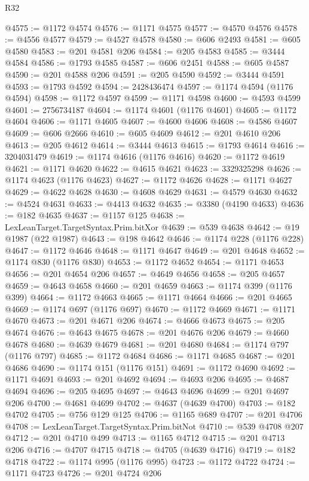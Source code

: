 \begin{lexlean}{R32}
\begin{coremodule}
@4575 := @1172 @4574
@4576 := @1171 @4575
@4577 := @4570 @4576
@4578 := @4556 @4577
@4579 := @4527 @4578
@4580 := @606 @2493
@4581 := @605 @4580
@4583 := @201 @4581 @206
@4584 := @205 @4583
@4585 := @3444 @4584
@4586 := @1793 @4585
@4587 := @606 @2451
@4588 := @605 @4587
@4590 := @201 @4588 @206
@4591 := @205 @4590
@4592 := @3444 @4591
@4593 := @1793 @4592
@4594 := 2428436474
@4597 := @1174 @4594 (@1176 @4594)
@4598 := @1172 @4597
@4599 := @1171 @4598
@4600 := @4593 @4599
@4601 := 2756734187
@4604 := @1174 @4601 (@1176 @4601)
@4605 := @1172 @4604
@4606 := @1171 @4605
@4607 := @4600 @4606
@4608 := @4586 @4607
@4609 := @606 @2666
@4610 := @605 @4609
@4612 := @201 @4610 @206
@4613 := @205 @4612
@4614 := @3444 @4613
@4615 := @1793 @4614
@4616 := 3204031479
@4619 := @1174 @4616 (@1176 @4616)
@4620 := @1172 @4619
@4621 := @1171 @4620
@4622 := @4615 @4621
@4623 := 3329325298
@4626 := @1174 @4623 (@1176 @4623)
@4627 := @1172 @4626
@4628 := @1171 @4627
@4629 := @4622 @4628
@4630 := @4608 @4629
@4631 := @4579 @4630
@4632 := @4524 @4631
@4633 := @4413 @4632
@4635 := @3380 (@4190 @4633)
@4636 := @182 @4635
@4637 := @1157 @125
@4638 := LexLeanTarget.TargetSyntax.Prim.bitXor
@4639 := @539 @4638
@4642 := @19 @1987 (@22 @1987)
@4643 := @198 @4642
@4646 := @1174 @228 (@1176 @228)
@4647 := @1172 @4646
@4648 := @1171 @4647
@4649 := @201 @4648
@4652 := @1174 @830 (@1176 @830)
@4653 := @1172 @4652
@4654 := @1171 @4653
@4656 := @201 @4654 @206
@4657 := @4649 @4656
@4658 := @205 @4657
@4659 := @4643 @4658
@4660 := @201 @4659
@4663 := @1174 @399 (@1176 @399)
@4664 := @1172 @4663
@4665 := @1171 @4664
@4666 := @201 @4665
@4669 := @1174 @697 (@1176 @697)
@4670 := @1172 @4669
@4671 := @1171 @4670
@4673 := @201 @4671 @206
@4674 := @4666 @4673
@4675 := @205 @4674
@4676 := @4643 @4675
@4678 := @201 @4676 @206
@4679 := @4660 @4678
@4680 := @4639 @4679
@4681 := @201 @4680
@4684 := @1174 @797 (@1176 @797)
@4685 := @1172 @4684
@4686 := @1171 @4685
@4687 := @201 @4686
@4690 := @1174 @151 (@1176 @151)
@4691 := @1172 @4690
@4692 := @1171 @4691
@4693 := @201 @4692
@4694 := @4693 @206
@4695 := @4687 @4694
@4696 := @205 @4695
@4697 := @4643 @4696
@4699 := @201 @4697 @206
@4700 := @4681 @4699
@4702 := @4637 (@4639 @4700)
@4703 := @182 @4702
@4705 := @756 @129 @125
@4706 := @1165 @689
@4707 := @201 @4706
@4708 := LexLeanTarget.TargetSyntax.Prim.bitNot
@4710 := @539 @4708 @207
@4712 := @201 @4710 @499
@4713 := @1165 @4712
@4715 := @201 @4713 @206
@4716 := @4707 @4715
@4718 := @4705 (@4639 @4716)
@4719 := @182 @4718
@4722 := @1174 @995 (@1176 @995)
@4723 := @1172 @4722
@4724 := @1171 @4723
@4726 := @201 @4724 @206

\end{coremodule}
\end{lexlean}
